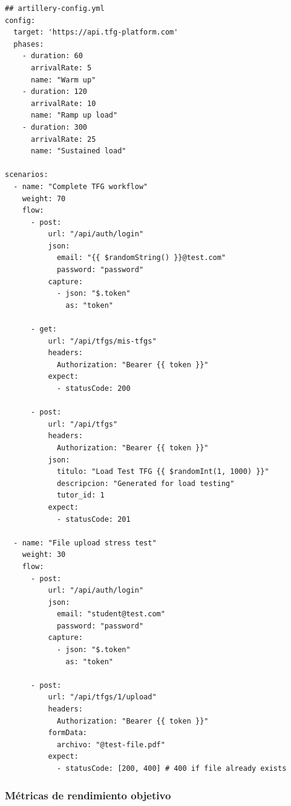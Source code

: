\documentclass[12pt,a4paper,oneside]{report}
\begin{document}
\begin{lstlisting}
## artillery-config.yml
config:
  target: 'https://api.tfg-platform.com'
  phases:
    - duration: 60
      arrivalRate: 5
      name: "Warm up"
    - duration: 120
      arrivalRate: 10
      name: "Ramp up load"
    - duration: 300
      arrivalRate: 25
      name: "Sustained load"

scenarios:
  - name: "Complete TFG workflow"
    weight: 70
    flow:
      - post:
          url: "/api/auth/login"
          json:
            email: "{{ $randomString() }}@test.com"
            password: "password"
          capture:
            - json: "$.token"
              as: "token"
      
      - get:
          url: "/api/tfgs/mis-tfgs"
          headers:
            Authorization: "Bearer {{ token }}"
          expect:
            - statusCode: 200

      - post:
          url: "/api/tfgs"
          headers:
            Authorization: "Bearer {{ token }}"
          json:
            titulo: "Load Test TFG {{ $randomInt(1, 1000) }}"
            descripcion: "Generated for load testing"
            tutor_id: 1
          expect:
            - statusCode: 201

  - name: "File upload stress test"
    weight: 30
    flow:
      - post:
          url: "/api/auth/login"
          json:
            email: "student@test.com"
            password: "password"
          capture:
            - json: "$.token"
              as: "token"

      - post:
          url: "/api/tfgs/1/upload"
          headers:
            Authorization: "Bearer {{ token }}"
          formData:
            archivo: "@test-file.pdf"
          expect:
            - statusCode: [200, 400] # 400 if file already exists
\end{lstlisting}

\subsubsection{Métricas de rendimiento
objetivo}\label{muxe9tricas-de-rendimiento-objetivo}
\end{document}
